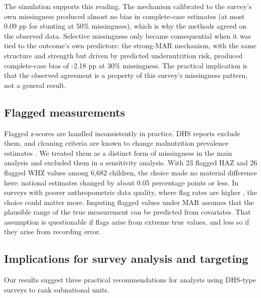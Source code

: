 \documentclass[11pt,a4paper]{article}
\begin{document}
The simulation supports this reading. The mechanism calibrated to the
survey's own missingness produced almost no bias in complete-case
estimates (at most 0.09 pp for stunting at 50\% missingness), which is
why the methods agreed on the observed data. Selective missingness only
became consequential when it was tied to the outcome's own predictors:
the strong-MAR mechanism, with the same structure and strength but
driven by predicted undernutrition risk, produced complete-case bias of
-2.18 pp at 30\% missingness. The practical implication is that the
observed agreement is a property of this survey's missingness pattern,
not a general result.

\subsection{Flagged measurements}\label{flagged-measurements}

Flagged z-scores are handled inconsistently in practice. DHS reports
exclude them, and cleaning criteria are known to change malnutrition
prevalence estimates \cite{crowe2014effect}. We treated them as a
distinct form of missingness in the main analysis and excluded them in a
sensitivity analysis. With 23 flagged HAZ and 26 flagged WHZ values
among 6,682 children, the choice made no material difference here:
national estimates changed by about 0.05 percentage points or less. In
surveys with poorer anthropometric data quality, where flag rates are
higher \cite{assaf2015assessment,perumal2020anthropometric}, the choice
could matter more. Imputing flagged values under MAR assumes that the
plausible range of the true measurement can be predicted from
covariates. That assumption is questionable if flags arise from extreme
true values, and less so if they arise from recording error.

\subsection{Implications for survey analysis and
targeting}\label{implications-for-survey-analysis-and-targeting}

Our results suggest three practical recommendations for analysts using
DHS-type surveys to rank subnational units.
\end{document}
